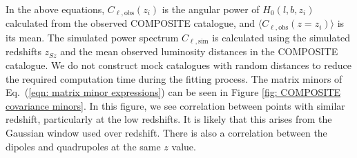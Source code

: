 \documentclass[a4paper,12pt]{report}
\renewcommand{\eqref}[1]{Eq.~({#1})}
\begin{document}
In the above equations, $C_{\ell, \text{obs}} (z_i)$ is the angular power of $H_0(l,b,z_i)$ calculated from the observed COMPOSITE catalogue, and $\langle C_{\ell, \text{obs}} (z=z_i) \rangle$ is its mean. The simulated power spectrum $C_{\ell, \text{sim}}$ is calculated using the simulated redshifts $z_{Sz}$ and the mean observed luminosity distances in the COMPOSITE catalogue. We do not construct mock catalogues with random distances to reduce the required computation time during the fitting process. The matrix minors of \eqref{\ref{eqn: matrix minor expressions}} can be seen in Figure \ref{fig: COMPOSITE covariance minors}. In this figure, we see correlation between points with similar redshift, particularly at the low redshifts. It is likely that this arises from the Gaussian window used over redshift. There is also a correlation between the dipoles and quadrupoles at the same $z$ value.
\end{document}
